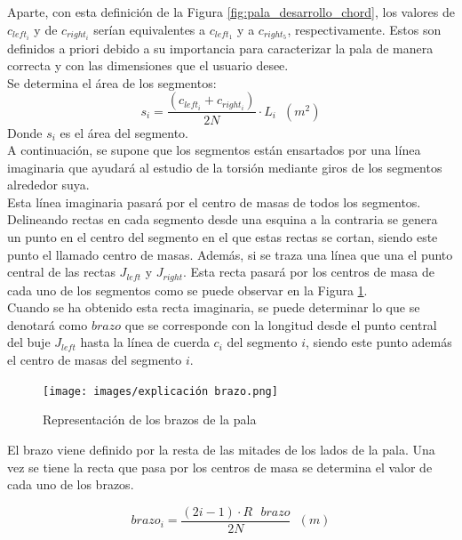 Aparte, con esta definición  de la Figura \ref{fig:pala_desarrollo_chord}, los valores de $c_{left_i}$ y de $c_{right_i}$ serían equivalentes a $c_{left_1}$ y a $c_{right_5}$, respectivamente. Estos son definidos a priori debido a su importancia para caracterizar la pala de manera correcta y con las dimensiones que el usuario desee.\\

Se determina el área de los segmentos:
\begin{equation}
 s_{i} = \dfrac{(c_{left_i} + c_{right_i})}{2N} \cdot L_i \hspace{7pt} (m^2)
\label{def:area_segmentos}
\end{equation}
Donde $s_i$ es el área del segmento.\\

A continuación, se supone que los segmentos están ensartados por una línea imaginaria que ayudará al estudio de la torsión mediante giros de los segmentos alrededor suya. \\

Esta línea imaginaria pasará por el centro de masas de todos los segmentos. Delineando rectas en cada segmento desde una esquina a la contraria se genera un punto en el centro del segmento en el que estas rectas se cortan, siendo este punto el llamado centro de masas. Además, si se traza una línea que una el punto central de las rectas $J_{left}$ y $J_{right}$. Esta recta pasará por los centros de masa de cada uno de los segmentos como se puede observar en la Figura \ref{fig:exp_brazo}.\\

Cuando se ha obtenido esta recta imaginaria, se puede determinar lo que se denotará como $brazo$ que se corresponde con la longitud desde el punto central del buje $J_{left}$ hasta la línea de cuerda $c_{i}$ del segmento $i$, siendo este punto además el centro de masas del segmento $i$.\\


    \begin{figure}[H]
    \centering
    \texttt{[image: images/explicación brazo.png]}
    \caption{Representación de los brazos de la pala}
    \label{fig:exp_brazo}
\end{figure}

El brazo viene definido por la resta de las mitades de los lados de la pala. Una vez se tiene la recta que pasa por los centros de masa se determina el valor de cada uno de los brazos.

\begin{equation}
brazo_i = \dfrac{(2i -1) \cdot R \text{ } brazo}{2N} \hspace{7pt} (m)
\end{equation}

